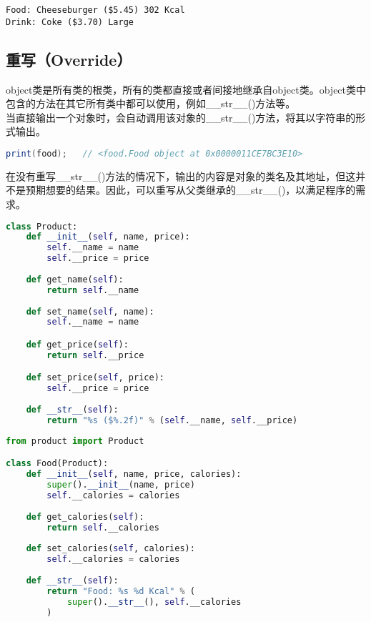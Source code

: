 \begin{tcolorbox}
    \begin{verbatim}
Food: Cheeseburger ($5.45) 302 Kcal
Drink: Coke ($3.70) Large
	\end{verbatim}
\end{tcolorbox}

\vspace{0.5cm}

\subsection{重写（Override）}

object类是所有类的根类，所有的类都直接或者间接地继承自object类。object类中包含的方法在其它所有类中都可以使用，例如\_\_str\_\_()方法等。\\

当直接输出一个对象时，会自动调用该对象的\_\_str\_\_()方法，将其以字符串的形式输出。

\vspace{-0.5cm}

\begin{lstlisting}[language=Java]
print(food);   // <food.Food object at 0x0000011CE7BC3E10>
\end{lstlisting}

在没有重写\_\_str\_\_()方法的情况下，输出的内容是对象的类名及其地址，但这并不是预期想要的结果。因此，可以重写从父类继承的\_\_str\_\_()，以满足程序的需求。\\


\begin{lstlisting}[language=Python]
class Product:
    def __init__(self, name, price):
        self.__name = name
        self.__price = price
    
    def get_name(self):
        return self.__name
    
    def set_name(self, name):
        self.__name = name

    def get_price(self):
        return self.__price

    def set_price(self, price):
        self.__price = price
    
    def __str__(self):
        return "%s ($%.2f)" % (self.__name, self.__price)
\end{lstlisting}

\begin{lstlisting}[language=Python]
from product import Product

class Food(Product):
    def __init__(self, name, price, calories):
        super().__init__(name, price)
        self.__calories = calories
    
    def get_calories(self):
        return self.__calories
    
    def set_calories(self, calories):
        self.__calories = calories
    
    def __str__(self):
        return "Food: %s %d Kcal" % (
            super().__str__(), self.__calories
        )
\end{lstlisting}

